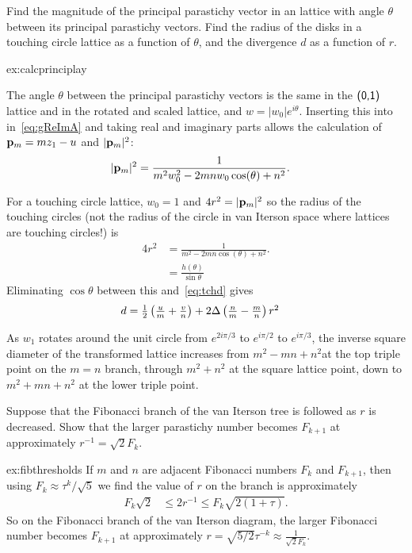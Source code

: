 \begin{jExercise}\label{ex:calcprinciplay}{
	Find the magnitude of the principal parastichy vector in an   lattice with angle $\theta$ between its principal parastichy vectors.
	Find the radius of the disks in a touching circle lattice as a function of $\theta$, and the divergence $d$ as a function of $r$.
}\end{jExercise}
\begin{jAnswer}{ex:calcprinciplay}{
The angle  $\theta$ between the principal parastichy vectors is the same in the $\textsf{(0,1)}$ lattice and in the rotated and scaled lattice, and  $w=|w_0|e^{i\theta}$.  Inserting this into in~\eqref{eq:gReImA} and taking real and imaginary parts allows the calculation of ${\mathbf p}_{m}=m z_1 -u$ and $|{\mathbf p}_{m}|^2$: 
	\begin{align}
	|{\mathbf p}_{m}|^2 &=\frac{1}{m^2 w_0^2-2 m n w_0 \cos (\theta )+n^2}.
		\end{align}
	
		
For a touching circle lattice, $w_0=1$ and $4r^2=	|{\mathbf p}_{m}|^2$ so the radius of the touching circles (not the radius of the circle in van Iterson space where lattices are touching circles!) is
\begin{align}
4 r^{2}  &=\frac{1}{ m^2-2 m n \cos (\theta )+n^2}.
\\
&= \frac{h(\theta)}{\sin \theta}
\end{align}
Eliminating $\cos\theta$ between this and~\eqref{eq:tchd} gives
\begin{align}
d&=		\textstyle{\frac{1}{2}}
\left(\frac{u}{m}+\frac{v}{n}\right)
+ 2\Delta  \left(\frac{n}{m}-\frac{m}{n}\right)r^2
\end{align}

As $w_1$ rotates around the unit circle from $e^{2i\pi/3}$ to $e^{i\pi/2}$ to $e^{i\pi/3}$, the inverse square diameter of the transformed lattice increases from $m^2-mn+n^2$at the top triple point on the $m=n$ branch, through  $m^2+n^2$ at the square lattice point, down to $m^2+mn+n^2$  at the lower triple point.
}
\end{jAnswer}

\begin{jExercise}\label{ex:fibthresholds}
Suppose that the Fibonacci branch of the van Iterson tree is followed as $r$ is decreased.
Show that the larger parastichy number becomes $F_{k+1}$ at approximately  $r^{-1}={\sqrt{2}F_k}$.
\end{jExercise}
\begin{jAnswer}{ex:fibthresholds}{
If $m$ and $n$ are adjacent Fibonacci numbers $F_{k}$ and $F_{k+1}$, then using $F_k\approx \tau^k/\sqrt{5}
$ we find the value of $r$ on the branch is approximately
	\begin{align}
  F_k \sqrt{2} &\leq	2 r^{-1}  \leq F_k \sqrt{2(1+\tau)}.
\end{align}
So on the Fibonacci branch of the van Iterson diagram, 
the larger Fibonacci number becomes $F_{k+1}$ at approximately $r=\sqrt{5/2}\tau^{-k}\approx \frac{1}{\sqrt{2}F_k}$.
}\end{jAnswer}





